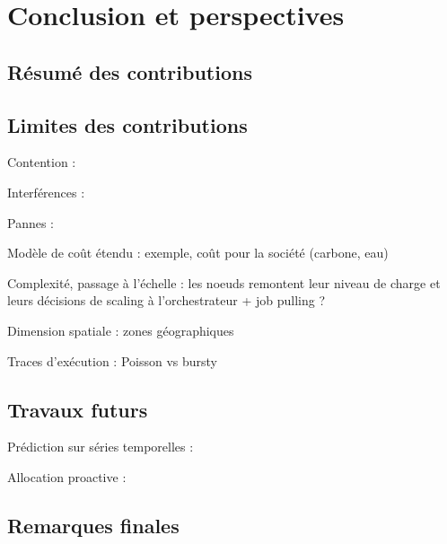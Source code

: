 \chapter{Conclusion et perspectives}
\label{chapter:conclusion}

\section{Résumé des contributions}

\section{Limites des contributions}

Contention : \cite{vanbeekCPUContentionPredictor2019} \cite{jacquetSweetspotVMOversubscribingCPU}

Interférences : \cite{kohAnalysisPerformanceInterference2007} \cite{vardasImprovedParallelApplication}

Pannes : \cite{javadiFailureTraceArchive2013, galletModelSpaceCorrelatedFailures2010}

Modèle de coût étendu : exemple, coût pour la société (carbone, eau) \cite{rickeCountrylevelSocialCost2018}

Complexité, passage à l'échelle : les noeuds remontent leur niveau de charge et leurs décisions de scaling à l'orchestrateur \cite{straesserPowerApplicationsVision2023} + job pulling ?

Dimension spatiale : zones géographiques

Traces d'exécution : Poisson vs bursty

\section{Travaux futurs}


Prédiction sur séries temporelles : \cite{bauerTimeSeriesForecasting2020}

Allocation proactive : \cite{parkGraphNeuralNetworkBased2024}

\section{Remarques finales}
